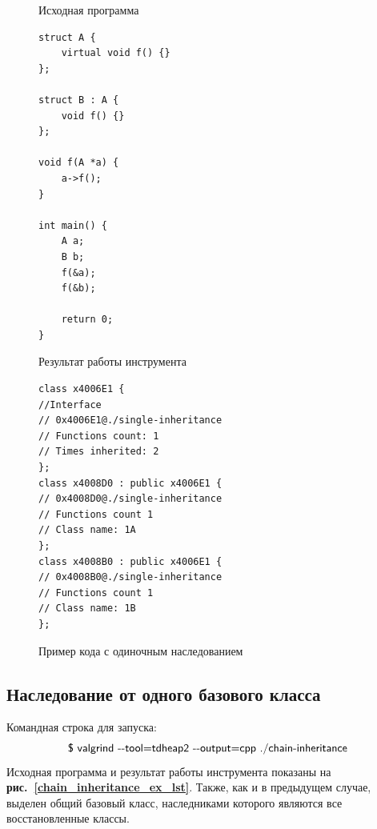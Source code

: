 \documentclass[a4paper,12pt,russian]{article}
\newcommand{\picref}[1]{\textbf{рис.~\ref{#1}}}
\newcommand{\code}[1]{\textsf{#1}}
\begin{document}
\begin{figure}[h!]
\begin{minipage}[t]{0.45\linewidth}
\caption*{Исходная программа}
\begin{lstlisting}
struct A {
    virtual void f() {}
};

struct B : A {
    void f() {}
};

void f(A *a) {
    a->f();
}

int main() {
    A a;
    B b;
    f(&a);
    f(&b);

    return 0;
}
\end{lstlisting}
\end{minipage}
\begin{minipage}[t]{0.5\linewidth}
\caption*{Результат работы инструмента}
\begin{lstlisting}
class x4006E1 {
//Interface
// 0x4006E1@./single-inheritance
// Functions count: 1
// Times inherited: 2
};
class x4008D0 : public x4006E1 {
// 0x4008D0@./single-inheritance
// Functions count 1
// Class name: 1A
};
class x4008B0 : public x4006E1 {
// 0x4008B0@./single-inheritance
// Functions count 1
// Class name: 1B
};
\end{lstlisting}
\end{minipage}
\caption{Пример кода с одиночным наследованием}
\label{single_inheritance_ex_lst}
\end{figure}

\subsection{Наследование от одного базового класса}
Командная строка для запуска:
\[\mbox{\code{\$ valgrind -{}-tool=tdheap2 -{}-output=cpp ./chain-inheritance}}\]
Исходная программа и результат работы инструмента показаны на \picref{chain_inheritance_ex_lst}.
Также, как и в предыдущем случае, выделен общий базовый класс, наследниками которого являются все восстановленные классы.
\end{document}
